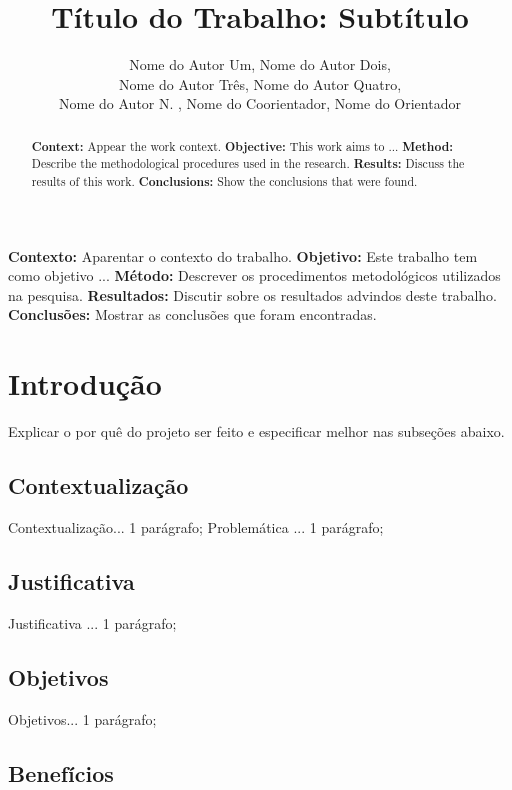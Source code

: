 \documentclass[12pt]{article}
\title{Título do Trabalho: Subtítulo}
\author{Nome do Autor Um\inst{1}, Nome do Autor Dois\inst{1}, \\Nome do Autor Três\inst{1}, Nome do Autor Quatro\inst{1}, \\Nome do Autor N. \inst{1}, Nome do Coorientador\inst{2}, Nome do Orientador\inst{2} }
\begin{document}
 

\maketitle

\begin{abstract}
\textbf {Context:} Appear the work context. \textbf {Objective:} This work aims to ... \textbf {Method:} Describe the methodological procedures used in the research. \textbf {Results:} Discuss the results of this work. \textbf {Conclusions:} Show the conclusions that were found.
\end{abstract}
     
\begin{resumo} 
  \textbf{Contexto:} Aparentar o contexto do trabalho. \textbf{Objetivo:} Este trabalho tem como objetivo ... \textbf{Método:} Descrever os procedimentos metodológicos utilizados na pesquisa. \textbf{Resultados:} Discutir sobre os resultados advindos deste trabalho. \textbf{Conclusões:} Mostrar as conclusões que foram encontradas.
\end{resumo}


\section{Introdução} 
\label{sec:introducao}

Explicar o por quê do projeto ser feito e especificar melhor nas subseções abaixo.

\subsection{Contextualização} 
\label{subsec:contextualizacao}
Contextualização... 1 parágrafo;
Problemática ... 1 parágrafo;

\subsection{Justificativa} 
Justificativa ... 1 parágrafo;

\subsection{Objetivos} 
Objetivos... 1 parágrafo;

\subsection{Benefícios} 
\end{document}
